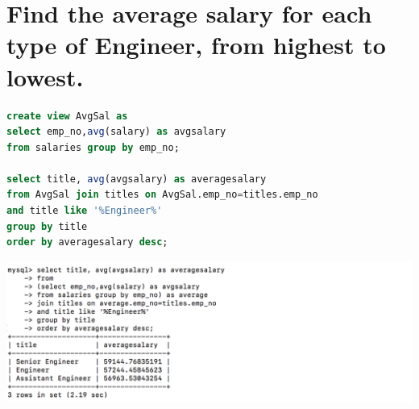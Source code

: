 \documentclass{article}
\begin{document}
\section{Find the average salary for each type of Engineer, from highest to lowest.}
\begin{lstlisting}[language=sql]
create view AvgSal as
select emp_no,avg(salary) as avgsalary
from salaries group by emp_no;

select title, avg(avgsalary) as averagesalary
from AvgSal join titles on AvgSal.emp_no=titles.emp_no 
and title like '%Engineer%'
group by title
order by averagesalary desc;
\end{lstlisting}
\includegraphics[width=\linewidth]{4.png}
\end{document}
